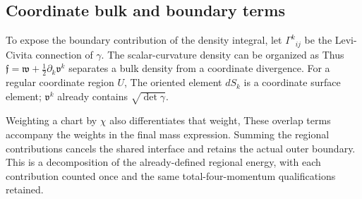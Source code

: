 \newpage
\subsection{Coordinate bulk and boundary terms}
To expose the boundary contribution of the density integral, let $\Gamma^k{}_{ij}$ be the Levi-Civita connection of $\gamma$. The scalar-curvature density can be organized as
\SourceBoundaryReductionDisplay
Thus $\mathfrak f=\mathfrak w+\tfrac12\partial_k\mathfrak v^k$ separates a bulk density from a coordinate divergence. For a regular coordinate region $U$,
\SourceBoundaryIntegralDisplay
The oriented element $dS_k$ is a coordinate surface element; $\mathfrak v^k$ already contains $\sqrt{\det\gamma}$.

Weighting a chart by $\chi$ also differentiates that weight,
\SourceWeightedBoundaryDisplay
These overlap terms accompany the weights in the final mass expression. Summing the regional contributions cancels the shared interface and retains the actual outer boundary. This is a decomposition of the already-defined regional energy, with each contribution counted once and the same total-four-momentum qualifications retained.
